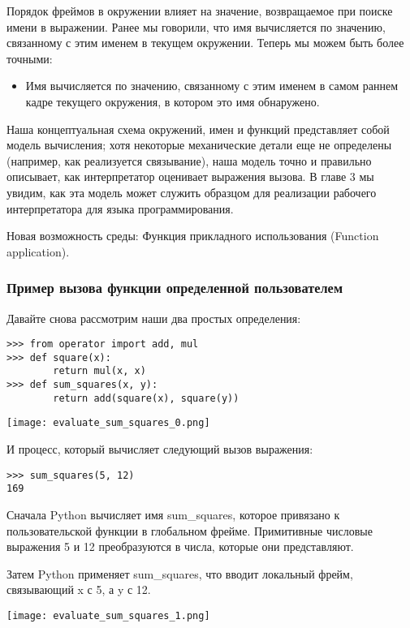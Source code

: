 Порядок фреймов в окружении влияет на значение, возвращаемое при поиске имени в выражении. Ранее мы говорили, что имя вычисляется по значению, связанному с этим именем в текущем окружении. Теперь мы можем быть более точными:
\begin{itemize}
  \item Имя вычисляется по значению, связанному с этим именем в самом раннем кадре текущего окружения, в котором это имя обнаружено.
\end{itemize}

Наша концептуальная схема окружений, имен и функций представляет собой модель вычисления; хотя некоторые механические детали еще не определены (например, как реализуется связывание), наша модель точно и правильно описывает, как интерпретатор оценивает выражения вызова. В главе 3 мы увидим, как эта модель может служить образцом для реализации рабочего интерпретатора для языка программирования.

Новая возможность среды: Функция прикладного использования (Function application).

\subsubsection{Пример вызова функции определенной пользователем}
Давайте снова рассмотрим наши два простых определения:
\begin{verbatim}
>>> from operator import add, mul
>>> def square(x):
        return mul(x, x)
>>> def sum_squares(x, y):
        return add(square(x), square(y))
\end{verbatim}

\begin{center}
  \texttt{[image: evaluate\_sum\_squares\_0.png]}
\end{center}

И процесс, который вычисляет следующий вызов выражения:
\begin{verbatim}
>>> sum_squares(5, 12)
169
\end{verbatim}

Сначала Python вычисляет имя sum\_squares, которое привязано к пользовательской функции в глобальном фрейме.
Примитивные числовые выражения 5 и 12 преобразуются в числа, которые они представляют.

Затем Python применяет sum\_squares, что вводит локальный фрейм, связывающий x с 5, а y с 12.
\begin{center}
  \texttt{[image: evaluate\_sum\_squares\_1.png]}
\end{center}

